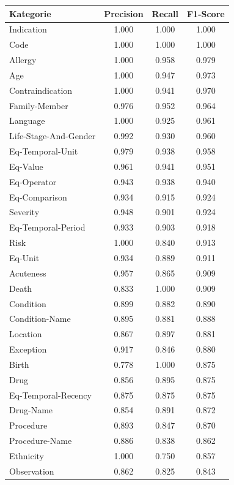 \begin{table}[htbp]
\centering
\begin{tabular}{p{5cm}ccc}
\toprule
\textbf{Kategorie} & \textbf{Precision} & \textbf{Recall} & \textbf{F1-Score} \\
\midrule
Indication & 1.000 & 1.000 & 1.000 \\
Code & 1.000 & 1.000 & 1.000 \\
Allergy & 1.000 & 0.958 & 0.979 \\
Age & 1.000 & 0.947 & 0.973 \\
Contraindication & 1.000 & 0.941 & 0.970 \\
Family-Member & 0.976 & 0.952 & 0.964 \\
Language & 1.000 & 0.925 & 0.961 \\
Life-Stage-And-Gender & 0.992 & 0.930 & 0.960 \\
Eq-Temporal-Unit & 0.979 & 0.938 & 0.958 \\
Eq-Value & 0.961 & 0.941 & 0.951 \\
Eq-Operator & 0.943 & 0.938 & 0.940 \\
Eq-Comparison & 0.934 & 0.915 & 0.924 \\
Severity & 0.948 & 0.901 & 0.924 \\
Eq-Temporal-Period & 0.933 & 0.903 & 0.918 \\
Risk & 1.000 & 0.840 & 0.913 \\
Eq-Unit & 0.934 & 0.889 & 0.911 \\
Acuteness & 0.957 & 0.865 & 0.909 \\
Death & 0.833 & 1.000 & 0.909 \\
Condition & 0.899 & 0.882 & 0.890 \\
Condition-Name & 0.895 & 0.881 & 0.888 \\
Location & 0.867 & 0.897 & 0.881 \\
Exception & 0.917 & 0.846 & 0.880 \\
Birth & 0.778 & 1.000 & 0.875 \\
Drug & 0.856 & 0.895 & 0.875 \\
Eq-Temporal-Recency & 0.875 & 0.875 & 0.875 \\
Drug-Name & 0.854 & 0.891 & 0.872 \\
Procedure & 0.893 & 0.847 & 0.870 \\
Procedure-Name & 0.886 & 0.838 & 0.862 \\
Ethnicity & 1.000 & 0.750 & 0.857 \\
Observation & 0.862 & 0.825 & 0.843 \\

\end{tabular}
\end{table}
